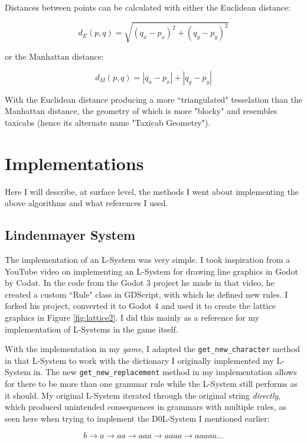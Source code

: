 Distances between points can be calculated with either the Euclidean distance:

$$ d_{E}(p, q) = \sqrt{(q_x - p_x)^2 + (q_y - p_y)^2} $$

or the Manhattan distance:

$$ d_{M}(p, q) = |q_x - p_x| + |q_y - p_y| $$

With the Euclidean distance producing a more ``triangulated" tesselation than the Manhattan distance, the geometry of which is more "blocky" and resembles taxicabs (hence its alternate name "Taxicab Geometry").

\section{Implementations}

Here I will describe, at surface level, the methods I went about implementing the above algorithms and what references I used.

\subsection{Lindenmayer System}

The implementation of an L-System was very simple. I took inspiration from a YouTube video on implementing an L-System for drawing line graphics in Godot by Codat.\cite{codatGD3LSystemYT} In the code from the Godot 3 project he made in that video\cite{codatGD3LSystemGH}\cite{codatGD3LSystemYT}, he created a custom ``Rule" class in GDScript, with which he defined new rules. I forked his project, converted it to Godot 4 and used it to create the lattice graphics in Figure \ref{fig:lattice2}. I did this mainly as a reference for my implementation of L-Systems in the game itself.

With the implementation in my \emph{game}, I adapted the \verb|get_new_character| method in that L-System to work with the dictionary I originally implemented my L-System in. The new \verb|get_new_replacement| method in my implementation allows for there to be more than one grammar rule while the L-System still performs as it should. My original L-System iterated through the original string \textit{directly}, which produced unintended consequences in grammars with multiple rules, as seen here when trying to implement the D0L-System I mentioned earlier\cite{lsystemintro}:

$$ b \rightarrow a \rightarrow aa \rightarrow aaa \rightarrow aaaa \rightarrow aaaaa \ldots $$

